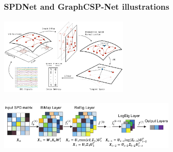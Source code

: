 \documentclass{beamer}
\begin{document}
\begin{frame}
	\frametitle{SPDNet and GraphCSP-Net illustrations}
	
	\begin{center}
		\includegraphics[height = 4cm, width=6.5cm]{images/2023_Ju.png}
	\end{center}
	
	\begin{center}
		\includegraphics[height = 2.5cm, width=9cm]{images/2017_Huang.png}
	\end{center}
\end{frame}
%
%
%
%
%
\end{document}
